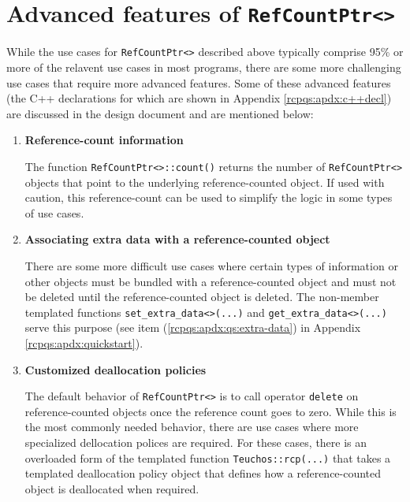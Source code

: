 \documentclass[pdf,ps2pdf,11pt]{SANDreport}
\begin{document}
%
\section{Advanced features of {}\texttt{Ref\-Count\-Ptr<>}}
%

While the use cases for {}\texttt{Ref\-Count\-Ptr<>} described above
typically comprise 95\% or more of the relavent use cases in most
programs, there are some more challenging use cases that require more
advanced features.  Some of these advanced features (the C++
declarations for which are shown in Appendix
{}\ref{rcpqs:apdx:c++decl}) are discussed in the design document
{}\cite{ref:RefCountPtr} and are mentioned below:

\begin{enumerate}

\item \textbf{Reference-count information}

The function {}\texttt{Ref\-Count\-Ptr<>\-::count()} returns the
number of {}\texttt{Ref\-Count\-Ptr<>} objects that point to the
underlying reference-counted object.  If used with caution, this
reference-count can be used to simplify the logic in some types of use
cases.

\item \textbf{Associating extra data with a reference-counted object}

There are some more difficult use cases where certain types of
information or other objects must be bundled with a reference-counted
object and must not be deleted until the reference-counted object is
deleted.  The non-member templated functions
{}\texttt{set\-\_extra\-\_data<>(...)} and
{}\texttt{get\-\_extra\-\_data<>(...)} serve this purpose (see item
({}\ref{rcpqs:apdx:qs:extra-data}) in Appendix
{}\ref{rcpqs:apdx:quickstart}).

\item \textbf{Customized deallocation policies}

The default behavior of {}\texttt{Ref\-Count\-Ptr<>} is to call
operator {}\texttt{delete} on reference-counted objects once the
reference count goes to zero.  While this is the most commonly needed
behavior, there are use cases where more specialized dellocation
polices are required.  For these cases, there is an overloaded form of
the templated function {}\texttt{Teuchos\-::rcp(...)} that takes a
templated deallocation policy object that defines how a
reference-counted object is deallocated when required.

\end{enumerate}
\end{document}
